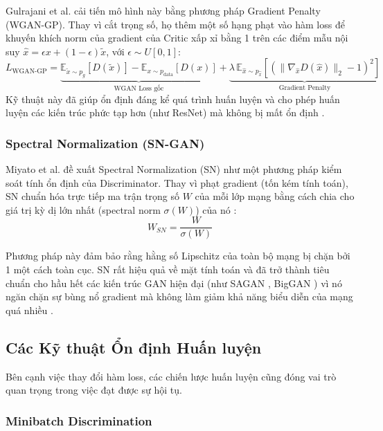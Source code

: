 Gulrajani et al. \cite{Gulrajani2017} cải tiến mô hình này bằng phương pháp Gradient Penalty (WGAN-GP). 
Thay vì cắt trọng số, họ thêm một số hạng phạt vào hàm loss để khuyến khích norm của gradient 
của Critic xấp xỉ bằng 1 trên các điểm mẫu nội suy $\hat{x} = \epsilon x + (1-\epsilon)\tilde{x}$,
với $\epsilon \sim U[0,1]$:
\begin{equation}
\label{eq:wgan_gp}
L_{\text{WGAN-GP}} = 
\underbrace{\mathbb{E}_{\tilde{x} \sim p_g}[D(\tilde{x})] - \mathbb{E}_{x \sim p_{\text{data}}}[D(x)]}_{\text{WGAN Loss gốc}} 
+ 
\underbrace{\lambda \, \mathbb{E}_{\hat{x} \sim p_{\hat{x}}}\!\left[\left(\|\nabla_{\hat{x}} D(\hat{x})\|_2 - 1\right)^2\right]}_{\text{Gradient Penalty}}
\end{equation}
Kỹ thuật này đã giúp ổn định đáng kể quá trình huấn luyện và cho phép huấn luyện các kiến 
trúc phức tạp hơn (như ResNet) mà không bị mất ổn định \cite{Gulrajani2017}.


\subsubsection{Spectral Normalization (SN-GAN)}

Miyato et al. \cite{Miyato2018} đề xuất Spectral Normalization (SN) như một phương pháp kiểm soát tính ổn định của Discriminator. Thay vì phạt gradient (tốn kém tính toán), SN chuẩn hóa trực tiếp ma trận trọng số $W$ của mỗi lớp mạng bằng cách chia cho giá trị kỳ dị lớn nhất (spectral norm $\sigma(W)$) của nó \cite{Miyato2018}:
\begin{equation}
\label{eq:spectral_norm}
W_{SN} = \frac{W}{\sigma(W)}
\end{equation}

Phương pháp này đảm bảo rằng hằng số Lipschitz của toàn bộ mạng bị chặn bởi 1 một cách toàn cục. SN rất hiệu quả về mặt tính toán và đã trở thành tiêu chuẩn cho hầu hết các kiến trúc GAN hiện đại (như SAGAN \cite{Zhang2019}, BigGAN \cite{Brock2018}) vì nó ngăn chặn sự bùng nổ gradient mà không làm giảm khả năng biểu diễn của mạng quá nhiều \cite{Miyato2018}.

\subsection{Các Kỹ thuật Ổn định Huấn luyện}
Bên cạnh việc thay đổi hàm loss, các chiến lược huấn luyện cũng đóng vai trò quan trọng trong việc đạt được sự hội tụ.

\subsubsection{Minibatch Discrimination}


